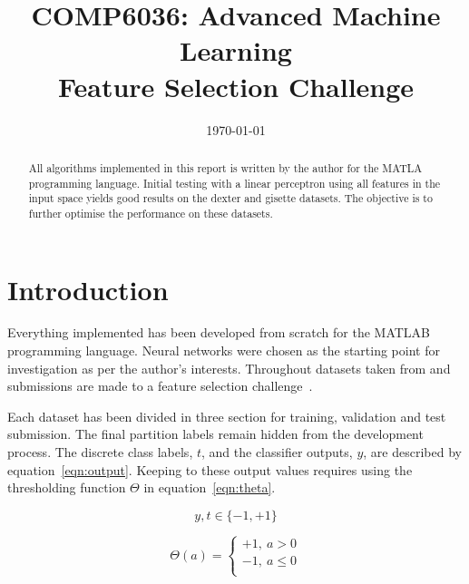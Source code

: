 \documentclass{ecsarticle}     %
\begin{document}
\frontmatter
\title      {COMP6036: Advanced Machine Learning\\
            Feature Selection Challenge}
      
\addresses  {\deptname\\\univname}

\date       {\today}
\subject    {}
\keywords   {}
\maketitle


\begin{abstract}
All algorithms implemented in this report is written by the author for the MATLA programming language.
Initial testing with a linear perceptron using all features in the input space yields good results on the dexter and gisette datasets.
The objective is to further optimise the performance on these datasets. 
\end{abstract}

\mainmatter


\section{Introduction}

Everything implemented has been developed from scratch for the MATLAB programming language. 
Neural networks were chosen as the starting point for investigation as per the author's interests. 
Throughout datasets taken from and submissions are made to a feature selection challenge~\citep{nips03feat}.

Each dataset has been divided in three section for training, validation and test submission.
The final partition labels remain hidden from the development process.
The discrete class labels, $t$, and the classifier outputs, $y$, are described by equation~\eqref{eqn:output}.
Keeping to these output values requires using the thresholding function $\Theta$ in equation~\eqref{eqn:theta}. 


\begin{equation}
	y,t \in \{-1,+1\}
	\label{eqn:output}
\end{equation}

\begin{equation}
	\Theta(a) = \left\{ 
      \begin{array}{l}
         +1,\:a > 0\\
         -1,\:a \leq 0\\
      \end{array} \right.	
	\label{eqn:theta}
\end{equation}
\end{document}
